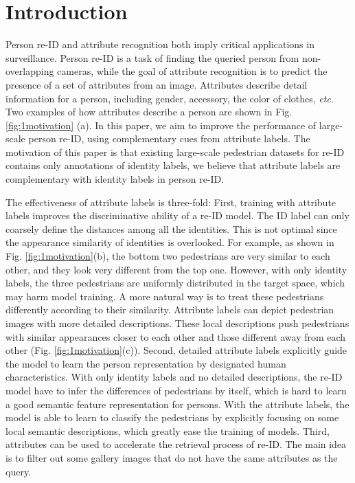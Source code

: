 \documentclass[5p,times,twocolumn]{elsarticle}
\begin{document}
\section{Introduction}
Person re-ID \citep{zhu2018fast,liu2017end,wu2017deep,ren2017multi} and attribute recognition \citep{zhu2017multi, deng2014pedestrian, abdulnabi2015multi} both imply critical applications in surveillance. Person re-ID is a task of finding the queried person from non-overlapping cameras, while the goal of attribute recognition is to predict the presence of a set of attributes from an image. Attributes describe detail information for a person, including gender, accessory, the color of clothes, \emph{etc}. Two examples of how attributes describe a person are shown in Fig. \ref{fig:1motivation} (a). In this paper, we aim to improve the performance of large-scale person re-ID, using complementary cues from attribute labels.
The motivation of this paper is that existing large-scale pedestrian datasets for re-ID contains only annotations of identity labels, we believe that attribute labels are complementary with identity labels in person re-ID. 
    
The effectiveness of attribute labels is three-fold:
First, training with attribute labels improves the discriminative ability of a re-ID model. The ID label can only coarsely define the distances among all the identities. This is not optimal since the appearance similarity of identities is overlooked. 
For example, as shown in Fig. \ref{fig:1motivation}(b), the bottom two pedestrians are very similar to each other, and they look very different from the top one. However, with only identity labels, the three pedestrians are uniformly distributed in the target space, which may harm model training. A more natural way is to treat these pedestrians differently according to their similarity. Attribute labels can depict pedestrian images with more detailed descriptions. These local descriptions push pedestrians with similar appearances closer to each other and those different away from each other (Fig. \ref{fig:1motivation}(c)). 
Second, detailed attribute labels explicitly guide the model to learn the person representation by designated human characteristics. With only identity labels and no detailed descriptions, the re-ID model have to infer the differences of pedestrians by itself, which is hard to learn a good semantic feature representation for persons. With the attribute labels, the model is able to learn to classify the pedestrians by explicitly focusing on some local semantic descriptions, which greatly ease the training of models.     
Third, attributes can be used to accelerate the retrieval process of re-ID. The main idea is to filter out some gallery images that do not have the same attributes as the query. 
    
\end{document}
